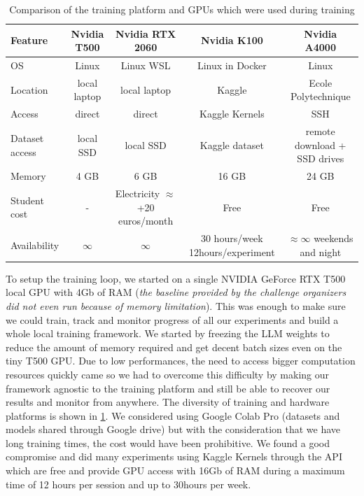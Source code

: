 \begin{table}[ht]
    \centering
    \begin{tabular}{lcccc}
    \hline
    \textbf{Feature} & \textbf{Nvidia T500} & \textbf{Nvidia RTX 2060} & \textbf{Nvidia K100} & \textbf{Nvidia A4000} \\ \hline
    OS & Linux & Linux WSL & Linux in Docker & Linux \\  
    Location            & local laptop           & local laptop  & Kaggle  & Ecole Polytechnique  \\
    Access & direct & direct & Kaggle Kernels & SSH \\
    Dataset access & local SSD & local SSD & Kaggle dataset & remote download + SSD drives\\ 
    Memory           & 4 GB                        & 6 GB                           & 16 GB                          & 24 GB                          \\
    Student cost & - & Electricity $\approx$ +20 euros/month & Free & Free \\
    Availability & $\infty$ & $\infty$ & 30 hours/week 12hours/experiment & $\approx \infty$ weekends and night \\
    \hline
    \end{tabular}
    \caption{Comparison of the training platform and GPUs which were used during training}
    \label{table:gpu_comparison}
\end{table}


To setup the training loop, we started on a single NVIDIA GeForce RTX T500 local GPU with 4Gb of RAM (\textit{the baseline provided by the challenge organizers did not even run because of memory limitation}). This was enough to make sure we could train, track and monitor progress of all our experiments and build a whole local training framework. We started by freezing the LLM weights to reduce the amount of memory required and get decent batch sizes even on the tiny T500 GPU. Due to low performances, the need to access bigger computation resources quickly came so we had to overcome this difficulty by making our framework agnostic to the training platform and still be able to recover our results and monitor from anywhere. The diversity of training and hardware platforms is shown in \ref*{table:gpu_comparison}. We considered using Google Colab Pro (datasets and models shared through Google drive) but with the consideration that we have long training times, the cost would have been prohibitive. We found a good compromise and did many experiments using Kaggle Kernels through the API which are free and provide GPU access with 16Gb of RAM during a maximum time of 12 hours per session and up to 30hours per week.
